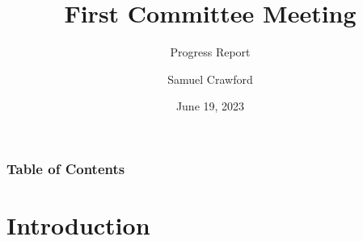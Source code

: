 \documentclass{beamer}
\title[Committee Meeting 1]{First Committee Meeting}
\subtitle{Progress Report}
\author{Samuel Crawford}
\institute{McMaster University}
\date{June 19, 2023}
\begin{document}

\frame{\titlepage}


\begin{frame}
    \frametitle{Table of Contents}
    \tableofcontents
\end{frame}

\section{Introduction}
\end{document}
